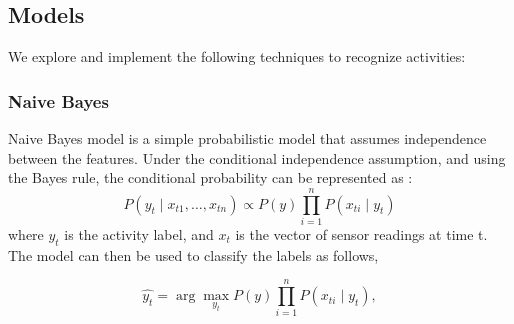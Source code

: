 \documentclass[11pt, oneside]{article}   	%
\begin{document}
\subsection{Models}
We explore and implement the following techniques to recognize activities:
%
%
%
%
%
%

\subsubsection{Naive Bayes}
Naive Bayes model is a simple probabilistic model that assumes independence between the features. 
Under the conditional independence assumption, and using the Bayes rule, the conditional probability can be represented as : 
\begin{equation}
P(y_t \mid x_{t1}, \dots, x_{tn}) \propto P(y) \prod_{i=1}^{n} P(x_{ti} \mid y_t) 
\end{equation}
where $y_t$ is the activity label, and $x_t$ is the vector of sensor readings at time t. The model can then be used to classify the labels as follows, 	

\begin{equation}
 \hat{y_t} = \arg\max_{y_t} P(y) \prod_{i=1}^{n} P(x_{ti} \mid y_t),
\end{equation}
\end{document}
